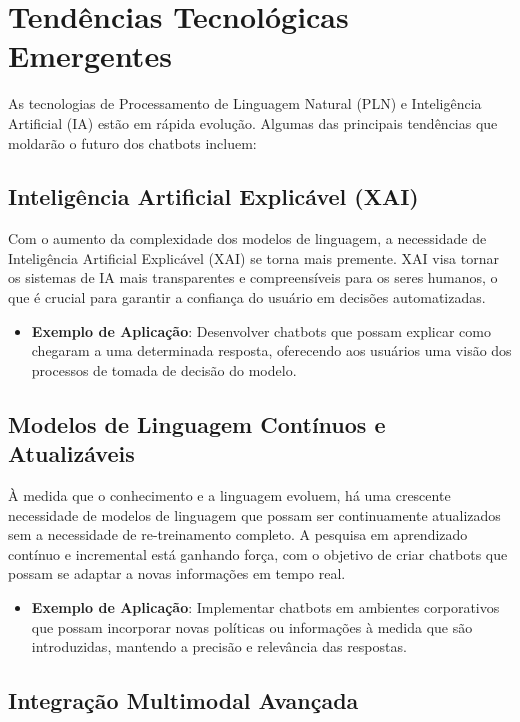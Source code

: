 \documentclass[14pt,a4paper,oneside]{book}
\begin{document}
\section{Tendências Tecnológicas Emergentes}

As tecnologias de Processamento de Linguagem Natural (PLN) e Inteligência Artificial (IA) estão em rápida evolução. Algumas das principais tendências que moldarão o futuro dos chatbots incluem:

\subsection{Inteligência Artificial Explicável (XAI)}

Com o aumento da complexidade dos modelos de linguagem, a necessidade de Inteligência Artificial Explicável (XAI) se torna mais premente. XAI visa tornar os sistemas de IA mais transparentes e compreensíveis para os seres humanos, o que é crucial para garantir a confiança do usuário em decisões automatizadas.

\begin{itemize}
	\item \textbf{Exemplo de Aplicação}: Desenvolver chatbots que possam explicar como chegaram a uma determinada resposta, oferecendo aos usuários uma visão dos processos de tomada de decisão do modelo.
\end{itemize}

\subsection{Modelos de Linguagem Contínuos e Atualizáveis}

À medida que o conhecimento e a linguagem evoluem, há uma crescente necessidade de modelos de linguagem que possam ser continuamente atualizados sem a necessidade de re-treinamento completo. A pesquisa em aprendizado contínuo e incremental está ganhando força, com o objetivo de criar chatbots que possam se adaptar a novas informações em tempo real.

\begin{itemize}
	\item \textbf{Exemplo de Aplicação}: Implementar chatbots em ambientes corporativos que possam incorporar novas políticas ou informações à medida que são introduzidas, mantendo a precisão e relevância das respostas.
\end{itemize}

\subsection{Integração Multimodal Avançada}
\end{document}
